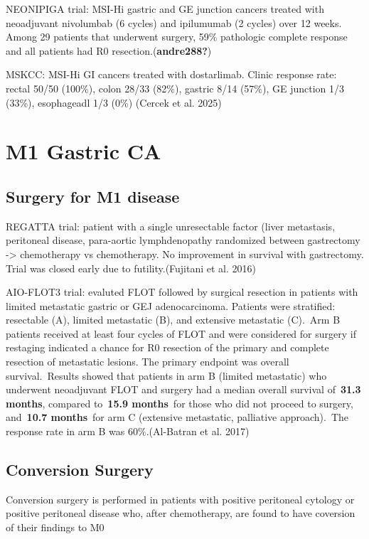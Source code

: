 \documentclass[
  letterpaper,
]{scrbook}
\begin{document}
NEONIPIGA trial: MSI-Hi gastric and GE junction cancers treated with
neoadjuvant nivolumbab (6 cycles) and ipilumumab (2 cycles) over 12
weeks. Among 29 patients that underwent surgery, 59\% pathologic
complete response and all patients had R0 resection.(\textbf{andre288?})

MSKCC: MSI-Hi GI cancers treated with dostarlimab. Clinic response rate:
rectal 50/50 (100\%), colon 28/33 (82\%), gastric 8/14 (57\%), GE
junction 1/3 (33\%), esophageadl 1/3 (0\%) (Cercek et al. 2025)

\chapter{M1 Gastric CA}\label{m1-gastric-ca}

\section{Surgery for M1 disease}\label{surgery-for-m1-disease}

REGATTA trial: patient with a single unresectable factor (liver
metastasis, peritoneal disease, para-aortic lymphdenopathy randomized
between gastrectomy -\textgreater{} chemotherapy vs chemotherapy. No
improvement in survival with gastrectomy. Trial was closed early due to
futility.(Fujitani et al. 2016)

AIO-FLOT3 trial: evaluted FLOT followed by surgical resection in
patients with limited metastatic gastric or GEJ adenocarcinoma. Patients
were stratified: resectable (A), limited metastatic (B), and extensive
metastatic (C).~Arm B patients received at least four cycles of FLOT and
were considered for surgery if restaging indicated a chance for R0
resection of the primary and complete resection of metastatic lesions.
The primary endpoint was overall survival.~Results showed that patients
in arm B (limited metastatic) who underwent neoadjuvant FLOT and surgery
had a median overall survival of~\textbf{31.3 months}, compared
to~\textbf{15.9 months}~for those who did not proceed to surgery,
and~\textbf{10.7 months}~for arm C (extensive metastatic, palliative
approach).~The response rate in arm B was 60\%.(Al-Batran et al. 2017)

\section{Conversion Surgery}\label{conversion-surgery}

Conversion surgery is performed in patients with positive peritoneal
cytology or positive peritoneal disease who, after chemotherapy, are
found to have coversion of their findings to M0
\end{document}

